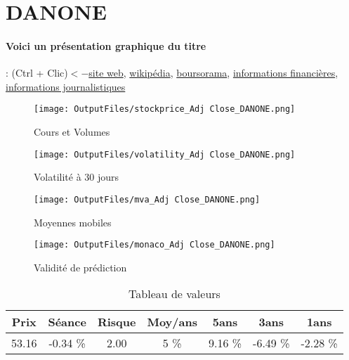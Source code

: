 \documentclass[11pt,a4paper]{report}%
\begin{document}
\newpage

\section{DANONE}

\paragraph{Voici un présentation graphique du titre} : (Ctrl + Clic)$<-$\href{https://www.danone.com/fr/investor-relations.html}{site web}, \href{https://fr.wikipedia.org/wiki/Danone}{wikipédia}, \href{https://www.boursorama.com/cours/1rPBN}{boursorama}, \href{https://www.qwant.com/?q=site:https:%2f%2fwww.easybourse.com%2faction-societe%2fDANONE&t=web&client=ext-firefox-hp}{informations financières}, \href{https://bourse.lerevenu.com/cours-de-bourse/fiche-valeur-synthese/DANONE/BN-FR}{informations journalistiques}
\begin{figure}[!htb]
   \begin{minipage}{0.5\textwidth}
     \centering
     \texttt{[image: OutputFiles/stockprice\_Adj Close\_DANONE.png]}
     \caption{Cours et Volumes}\label{Fig:price_DANONE}
   \end{minipage}\hfill
   \begin{minipage}{0.5\textwidth}
     \centering
     \texttt{[image: OutputFiles/volatility\_Adj Close\_DANONE.png]}
     \caption{Volatilité à 30 jours}\label{Fig:volat_DANONE}
   \end{minipage}
\end{figure}
\begin{figure}[!htb]
   \begin{minipage}{0.5\textwidth}
     \centering
     \texttt{[image: OutputFiles/mva\_Adj Close\_DANONE.png]}
     \caption{Moyennes mobiles}\label{Fig:mva_DANONE}
   \end{minipage}\hfill
   \begin{minipage}{0.5\textwidth}
     \centering
     \texttt{[image: OutputFiles/monaco\_Adj Close\_DANONE.png]}
     \caption{Validité de prédiction}\label{Fig:prediction_DANONE}
   \end{minipage}
\end{figure}

\begin{table}[H]
  \centering
    \begin{tabular}{|c|c|c|c|c|c|c|}
    \hline
    Prix & Séance & Risque  & Moy/ans & 5ans & 3ans & 1ans \\
    \hline
    53.16 &    -0.34 \%    & 2.00 & 5 \% & 9.16 \% & -6.49 \% & -2.28 \% \\
    \hline
    \end{tabular}%
        \label{tab:table_DANONE}%
      \caption{Tableau de valeurs}
\end{table}%
\end{document}
